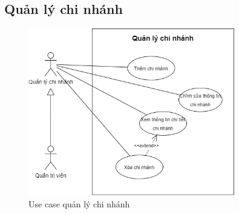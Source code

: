 \subsection{Quản lý chi nhánh}
\begin{figure}[!htp]
    \centering
    \includegraphics[width=9cm]{img/UseCase/UseCase-Quản lý chi nhánh.drawio.png}
    \newline
    \caption{Use case quản lý chi nhánh}
\end{figure}
